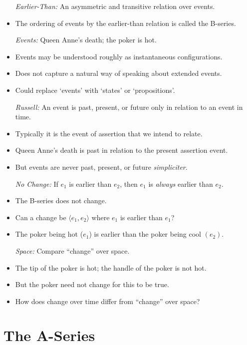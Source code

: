 \documentclass[a4paper, 11pt]{article} %
\newcommand{\tuple}[1]{\langle#1\rangle} %
\begin{document}
\begin{itemize}
  \item[\it Earlier-Than:] An asymmetric and transitive relation over events. 
    \item The ordering of events by the earlier-than relation is called the B-series.
  \item[\it Events:] Queen Anne's death; the poker is hot.
    \item Events may be understood roughly as instantaneous configurations.
    \item Does not capture a natural way of speaking about extended events.
    \item Could replace `events' with `states' or `propositions'.
  \item[\it Russell:] An event is past, present, or future only in relation to an event in time. 
    \item Typically it is the event of assertion that we intend to relate.
    \item Queen Anne's death is past in relation to the present assertion event.
    \item But events are never past, present, or future \textit{simpliciter}.
  \item[\it No Change:] If $e_1$ is earlier than $e_2$, then $e_1$ is \textit{always} earlier than $e_2$. 
    \item The B-series does not change.
    \item Can a change be $\tuple{e_1,e_2}$ where $e_1$ is earlier than $e_1$?
    \item The poker being hot ($e_1$) is earlier than the poker being cool $(e_2)$.
  \item[\it Space:] Compare ``change'' over space.
    \item The tip of the poker is hot; the handle of the poker is not hot.
    \item But the poker need not change for this to be true.
    \item How does change over time differ from ``change'' over space?
\end{itemize}





\section*{The A-Series}
\end{document}
